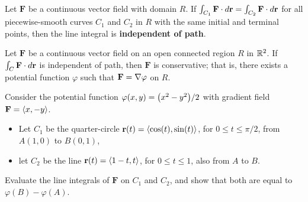 \documentclass[mathNotesPreamble]{subfiles}
\begin{document}
  \begin{defn*}
    Let $\mathbf F$ be a continuous vector field with domain $R$. If $\int_{C_1} \mathbf F\cdot d{\mathbf{r}}=\int_{C_2} \mathbf F\cdot d{\mathbf{r}}$ for all piecewise-smooth curves $C_1$ and $C_2$ in $R$ with the same initial and terminal points, then the line integral is \textbf{independent of path}.
  \end{defn*}
  \pagebreak

  \begin{thmBox*}[Theorem 17.5]
    Let $\mathbf F$ be a continuous vector field on an open connected region $R$ in $\mathbb{R}^2$. If $\int_C \mathbf F\cdot d{\mathbf{r}}$ is independent of path, then $\mathbf F$ is conservative; that is, there exists a potential function $\varphi$ such that $\mathbf F=\nabla \varphi$ on $R$. 
  \end{thmBox*}

  \begin{ex*}
    Consider the potential function $\varphi(x,y)={\left(x^2-y^2\right)}/2$ with gradient field $\mathbf F={\left\langle x,-y \right\rangle}$.
    \begin{itemize}
      \item Let $C_1$ be the quarter-circle ${\mathbf{r}}(t)={\left\langle \cos(t),\sin(t) \right\rangle}$, for $0\leq t\leq \pi/2$, from $A(1,0)$ to $B(0,1)$,
      \item let $C_2$ be the line ${\mathbf{r}}(t)={\left\langle 1-t,t \right\rangle}$, for $0\leq t\leq 1$, also from $A$ to $B$.
    \end{itemize}
    Evaluate the line integrals of $\mathbf F$ on $C_1$ and $C_2$, and show that both are equal to $\varphi(B)-\varphi(A)$.
  \end{ex*}
  \pagebreak
\end{document}
